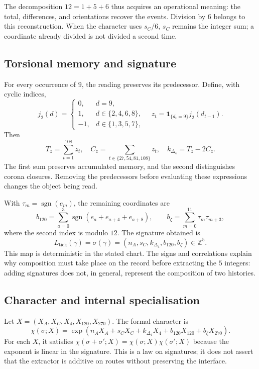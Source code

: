 The decomposition \(12=1+5+6\) thus acquires an operational meaning:
the total, differences, and orientations recover the events.
Division by \(6\) belongs to this reconstruction. When the character
uses \(s_C/6\), \(s_C\) remains the integer sum; a coordinate already
divided is not divided a second time.

\subsection{Torsional memory and signature}

For every occurrence of \(9\), the reading preserves its predecessor.
Define, with cyclic indices,
\[
 j_2(d)=\begin{cases}0,&d=9,\\1,&d\in\{2,4,6,8\},\\-1,&d\in\{1,3,5,7\},\end{cases}
 \quad z_t=\mathbf1_{\{d_t=9\}}j_2(d_{t-1}).
\]
Then
\[
 T_z=\sum_{t=1}^{108}z_t,\quad
 C_z=\sum_{t\in\{27,54,81,108\}}z_t,\quad
 k_{\Delta_4}=T_z-2C_z.
\]
The first sum preserves accumulated memory, and the second distinguishes
corona closures. Removing the predecessors before evaluating these
expressions changes the object being read.

With \(\tau_m=\operatorname{sgn}(e_m)\), the remaining coordinates are
\[
 b_{120}=\sum_{a=0}^{3}\operatorname{sgn}(e_a+e_{a+4}+e_{a+8}),
 \qquad b_{\zeta}=\sum_{m=0}^{11}\tau_m\tau_{m+3},
\]
where the second index is modulo \(12\). The signature obtained is
\[
 L_{\mathrm{tick}}(\gamma)
 =\sigma(\gamma)=(n_A,s_C,k_{\Delta_4},b_{120},b_{\zeta})\in\mathbb Z^5.
\]
This map is deterministic in the stated chart. The signs and
correlations explain why composition must take place on the
record before extracting the \(5\) integers: adding signatures does not,
in general, represent the composition of two histories.

\subsection{Character and internal specialisation}

Let \(X=(X_A,X_C,X_4,X_{120},X_{270})\). The formal character is
\[
 \chi(\sigma;X)=\exp\!\left(n_AX_A+s_CX_C+k_{\Delta_4}X_4+
 b_{120}X_{120}+b_{\zeta}X_{270}\right).
\]
For each \(X\), it satisfies
\(\chi(\sigma+\sigma';X)=\chi(\sigma;X)\chi(\sigma';X)\)
because the exponent is linear in the signature. This is a law on signatures; it
does not assert that the extractor is additive on routes without preserving the interface.

